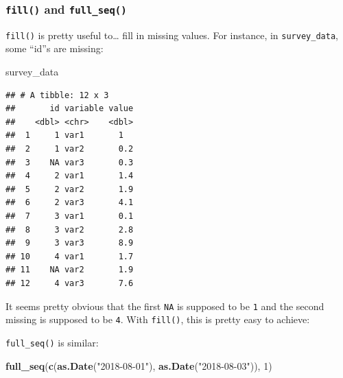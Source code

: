 \documentclass[]{gitbook}
\newenvironment{Shaded}{\begin{snugshade}}{\end{snugshade}}
\newcommand{\DataTypeTok}[1]{\textcolor[rgb]{0.13,0.29,0.53}{#1}}
\newcommand{\DecValTok}[1]{\textcolor[rgb]{0.00,0.00,0.81}{#1}}
\newcommand{\KeywordTok}[1]{\textcolor[rgb]{0.13,0.29,0.53}{\textbf{#1}}}
\newcommand{\NormalTok}[1]{#1}
\newcommand{\OperatorTok}[1]{\textcolor[rgb]{0.81,0.36,0.00}{\textbf{#1}}}
\newcommand{\StringTok}[1]{\textcolor[rgb]{0.31,0.60,0.02}{#1}}
\begin{document}
\hypertarget{fill-and-full_seq}{%
\subsubsection{\texorpdfstring{\texttt{fill()} and \texttt{full\_seq()}}{fill() and full\_seq()}}\label{fill-and-full_seq}}

\texttt{fill()} is pretty useful to\ldots{} fill in missing values. For instance, in \texttt{survey\_data}, some ``id''s
are missing:

\begin{Shaded}
\begin{Highlighting}[]
\NormalTok{survey_data}
\end{Highlighting}
\end{Shaded}

\begin{verbatim}
## # A tibble: 12 x 3
##       id variable value
##    <dbl> <chr>    <dbl>
##  1     1 var1       1  
##  2     1 var2       0.2
##  3    NA var3       0.3
##  4     2 var1       1.4
##  5     2 var2       1.9
##  6     2 var3       4.1
##  7     3 var1       0.1
##  8     3 var2       2.8
##  9     3 var3       8.9
## 10     4 var1       1.7
## 11    NA var2       1.9
## 12     4 var3       7.6
\end{verbatim}

It seems pretty obvious that the first \texttt{NA} is supposed to be \texttt{1} and the second missing is supposed
to be \texttt{4}. With \texttt{fill()}, this is pretty easy to achieve:

\begin{Shaded}
\end{Shaded}

\texttt{full\_seq()} is similar:

\begin{Shaded}
\begin{Highlighting}[]
\KeywordTok{full_seq}\NormalTok{(}\KeywordTok{c}\NormalTok{(}\KeywordTok{as.Date}\NormalTok{(}\StringTok{"2018-08-01"}\NormalTok{), }\KeywordTok{as.Date}\NormalTok{(}\StringTok{"2018-08-03"}\NormalTok{)), }\DecValTok{1}\NormalTok{)}
\end{Highlighting}
\end{Shaded}
\end{document}
